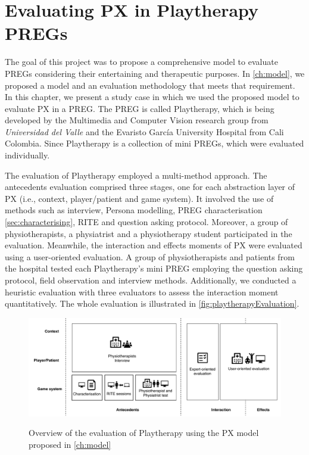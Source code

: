 \chapter{Evaluating PX in Playtherapy \acp{PREG}}
\label{ch:playtherapy}
The goal of this project was to propose a comprehensive model to evaluate \acp{PREG} considering their entertaining and therapeutic purposes. In \autoref{ch:model}, we proposed a model and an evaluation methodology that meets that requirement. In this chapter, we present a study case in which we used the proposed model to evaluate \ac{PX} in a \ac{PREG}. The \ac{PREG} is called Playtherapy, which is being developed by the Multimedia and Computer Vision research group from \textit{Universidad del Valle} and the Evaristo Garc\'ia University Hospital from Cali Colombia. Since Playtherapy is a collection of mini \acp{PREG}, which were evaluated individually.

The evaluation of Playtherapy employed a multi-method approach. The antecedents evaluation comprised three stages, one for each abstraction layer of \ac{PX} (i.e., context, player/patient and game system). It involved the use of methods such as interview, Persona modelling, \ac{PREG} characterisation \autoref{sec:characterising}, \ac{RITE} and question asking protocol. Moreover, a group of physiotherapists, a physiatrist and a physiotherapy student participated in the evaluation. Meanwhile, the interaction and effects moments of \ac{PX} were evaluated using a user-oriented evaluation. A group of physiotherapists and patients from the hospital tested each Playtherapy's mini \ac{PREG} employing the question asking protocol, field observation and interview methods. Additionally, we conducted a heuristic evaluation with three evaluators to assess the interaction moment quantitatively. The whole evaluation is illustrated in \autoref{fig:playtherapyEvaluation}.

\begin{figure}[bth]
\myfloatalign
{\includegraphics[width=\linewidth]{gfx/playtherapy/playtherapyEvaluation}} \quad
\caption{Overview of the evaluation of Playtherapy using the \ac{PX} model proposed in \autoref{ch:model}}
\label{fig:playtherapyEvaluation}
\end{figure}


